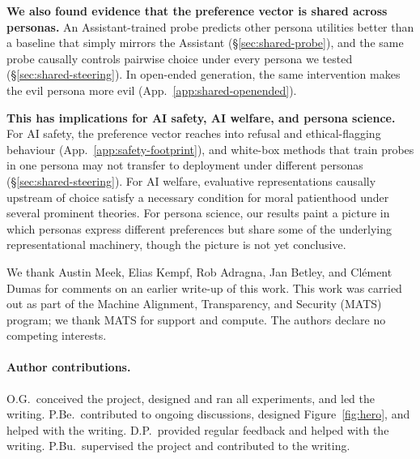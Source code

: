\documentclass{article}
\begin{document}
\textbf{We also found evidence that the preference vector is shared across personas.} An Assistant-trained probe predicts other persona utilities better than a baseline that simply mirrors the Assistant (\S\ref{sec:shared-probe}), and the same probe causally controls pairwise choice under every persona we tested (\S\ref{sec:shared-steering}). In open-ended generation, the same intervention makes the evil persona more evil (App.~\ref{app:shared-openended}).

\textbf{This has implications for AI safety, AI welfare, and persona science.} For AI safety, the preference vector reaches into refusal and ethical-flagging behaviour (App.~\ref{app:safety-footprint}), and white-box methods that train probes in one persona may not transfer to deployment under different personas (\S\ref{sec:shared-steering}). For AI welfare, evaluative representations causally upstream of choice satisfy a necessary condition for moral patienthood under several prominent theories. For persona science, our results paint a picture in which personas express different preferences but share some of the underlying representational machinery, though the picture is not yet conclusive.

\begin{ack}
We thank Austin Meek, Elias Kempf, Rob Adragna, Jan Betley, and Cl\'ement Dumas for comments on an earlier write-up of this work. This work was carried out as part of the Machine Alignment, Transparency, and Security (MATS) program; we thank MATS for support and compute. The authors declare no competing interests.

\paragraph{Author contributions.} O.G.\ conceived the project, designed and ran all experiments, and led the writing. P.Be.\ contributed to ongoing discussions, designed Figure~\ref{fig:hero}, and helped with the writing. D.P.\ provided regular feedback and helped with the writing. P.Bu.\ supervised the project and contributed to the writing.
\end{ack}

\small



\appendix

\renewcommand{\topfraction}{0.9}
\renewcommand{\bottomfraction}{0.7}
\renewcommand{\textfraction}{0.07}
\renewcommand{\floatpagefraction}{0.95}
\end{document}
